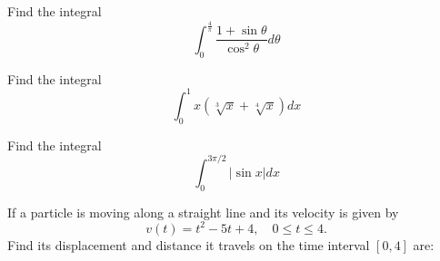 \documentclass[
  course = {{MATH102 Calculus II}},
  quartile = {{2}},
  assignment = - Midterm,%
  firstexercise = 1,
  term = 202
]{../aga-homework}
\begin{document}

\problem Find the integral
\[
\int_{0}^{\frac{4}{\pi}} \frac{1+\sin\theta}{\cos^2\theta}d\theta
\]
\newpage

\problem Find the integral
\[
\int_{0}^{1} x\left(\sqrt[3]{x}+\sqrt[4]{x}\right)dx
\]
\newpage


\problem Find the integral
\[
\int_{0}^{3\pi/2} \left|\sin x\right|dx
\]
\newpage

\problem If a particle is moving along a straight line and its velocity
is given by
\[
v(t) = t^2 - 5t + 4, \quad 0 \leq t \leq 4.
\]
Find its displacement and distance it travels on the time
interval $[0, 4]$ are:
\end{document}
